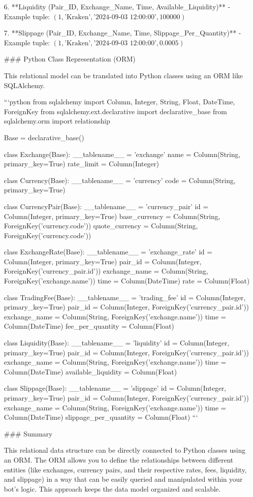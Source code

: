 6. **Liquidity (Pair\_ID, Exchange\_Name, Time, Available\_Liquidity)**
   - Example tuple: \( (1, \text{'Kraken'}, \text{'2024-09-03 12:00:00'}, 100000) \)

7. **Slippage (Pair\_ID, Exchange\_Name, Time, Slippage\_Per\_Quantity)**
   - Example tuple: \( (1, \text{'Kraken'}, \text{'2024-09-03 12:00:00'}, 0.0005) \)

### Python Class Representation (ORM)

This relational model can be translated into Python classes using an ORM like SQLAlchemy.

```python
from sqlalchemy import Column, Integer, String, Float, DateTime, ForeignKey
from sqlalchemy.ext.declarative import declarative_base
from sqlalchemy.orm import relationship

Base = declarative_base()

class Exchange(Base):
    __tablename__ = 'exchange'
    name = Column(String, primary_key=True)
    rate_limit = Column(Integer)

class Currency(Base):
    __tablename__ = 'currency'
    code = Column(String, primary_key=True)

class CurrencyPair(Base):
    __tablename__ = 'currency_pair'
    id = Column(Integer, primary_key=True)
    base_currency = Column(String, ForeignKey('currency.code'))
    quote_currency = Column(String, ForeignKey('currency.code'))

class ExchangeRate(Base):
    __tablename__ = 'exchange_rate'
    id = Column(Integer, primary_key=True)
    pair_id = Column(Integer, ForeignKey('currency_pair.id'))
    exchange_name = Column(String, ForeignKey('exchange.name'))
    time = Column(DateTime)
    rate = Column(Float)

class TradingFee(Base):
    __tablename__ = 'trading_fee'
    id = Column(Integer, primary_key=True)
    pair_id = Column(Integer, ForeignKey('currency_pair.id'))
    exchange_name = Column(String, ForeignKey('exchange.name'))
    time = Column(DateTime)
    fee_per_quantity = Column(Float)

class Liquidity(Base):
    __tablename__ = 'liquidity'
    id = Column(Integer, primary_key=True)
    pair_id = Column(Integer, ForeignKey('currency_pair.id'))
    exchange_name = Column(String, ForeignKey('exchange.name'))
    time = Column(DateTime)
    available_liquidity = Column(Float)

class Slippage(Base):
    __tablename__ = 'slippage'
    id = Column(Integer, primary_key=True)
    pair_id = Column(Integer, ForeignKey('currency_pair.id'))
    exchange_name = Column(String, ForeignKey('exchange.name'))
    time = Column(DateTime)
    slippage_per_quantity = Column(Float)
```

### Summary

This relational data structure can be directly connected to Python classes using an ORM. The ORM allows you to define the relationships between different entities (like exchanges, currency pairs, and their respective rates, fees, liquidity, and slippage) in a way that can be easily queried and manipulated within your bot's logic. This approach keeps the data model organized and scalable.